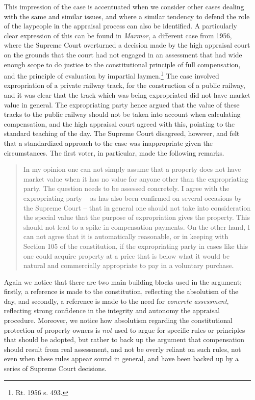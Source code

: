\documentclass[10pt]{article} %
\begin{document}
This impression of the case is accentuated when we consider other cases dealing with the same and similar issues, and where a similar tendency to defend the role of the laypeople in the appraisal process can also be identified. A particularly clear expression of this can be found in \emph{Marmor}, a different case from 1956, where the Supreme Court overturned a decision made by the high appraisal court on the grounds that the court had not engaged in an assessment that had wide enough scope to do justice to the constitutional principle of full compensation, and the principle of evaluation by impartial laymen.\footnote{Rt. 1956 s. 493.} The case involved expropriation of a private railway track, for the construction of a public railway, and it was clear that the track which was being expropriated did not have market value in general. The expropriating party hence argued that the value of these tracks to the public railway should not be taken into account when calculating compensation, and the high appraisal court agreed with this, pointing to the standard teaching of the day. The Supreme Court disagreed, however, and felt that a standardized approach to the case was inappropriate given the circumstances. The first voter, in particular, made the following remarks.

\begin{quote}
In my opinion one can not simply assume that a property does not have market value when it has no value for anyone other than the expropriating party. The question needs to be assessed concretely. I agree with the expropriating party -- as has also been confirmed on several occasions by the Supreme Court -- that in general one should not take into consideration the special value that the purpose of expropriation gives the property. This should not lead to a spike in compensation payments. On the other hand, I can not agree that it is automatically reasonable, or in keeping with Section 105 of the constitution, if the expropriating party in cases like this one could acquire property at a price that is below what it would be natural and commercially appropriate to pay in a voluntary purchase.
\end{quote}

Again we notice that there are two main building blocks used in the argument; firstly, a reference is made to the constitution, reflecting the absolutism of the day, and secondly, a reference is made to the need for \emph{concrete assessment}, reflecting strong confidence in the integrity and autonomy the appraisal procedure. Moreover, we notice how absolutism regarding the constitutional protection of property owners is \emph{not} used to argue for specific rules or principles that should be adopted, but rather to back up the argument that compensation should result from real assessment, and not be overly reliant on such rules, not even when these rules appear sound in general, and have been backed up by a series of Supreme Court decisions.
\end{document}
